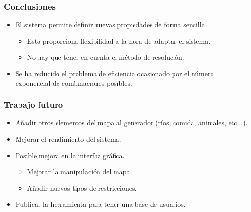 \begin{frame}
\frametitle{Conclusiones}

\begin{itemize}
	\item El sistema permite definir \textcolor{UDCpink}{nuevas propiedades} de forma sencilla.
	
	\vspace{1em}
	
	\begin{itemize}
		\item Esto proporciona \textcolor{UDCpink}{flexibilidad} a la hora de adaptar el sistema.
		
		\vspace{0.5em}
		
		\item No hay que tener en cuenta el \textcolor{UDCpink}{método de resolución}.
	\end{itemize}

	\vspace{1em}

	\item Se ha reducido el problema de eficiencia ocasionado por el \textcolor{UDCpink}{número exponencial de combinaciones posibles}.
\end{itemize}

\end{frame}

\begin{frame}
\frametitle{Trabajo futuro}

\begin{itemize}
	\item Añadir otros elementos del mapa al generador (ríos, comida, animales, etc...).
	
	\vspace{1em}
	
	\item Mejorar el rendimiento del sistema.
	
	\vspace{1em}
	
	\item Posible mejora en la interfaz gráfica.
	
	\vspace{1em}
	
	\begin{itemize}
		\item Mejorar la manipulación del mapa.
		
		\vspace{0.5em}
		
		\item Añadir nuevos tipos de restricciones.
	\end{itemize}
	
	\vspace{1em}
	
	\item Publicar la herramienta para tener una base de usuarios.
\end{itemize}
\end{frame}